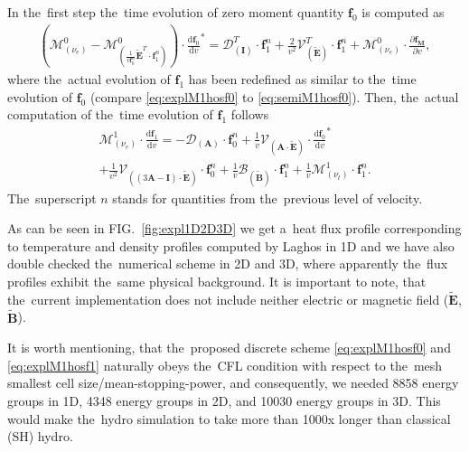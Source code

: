 \documentclass[review]{elsarticle}
\newcommand{\pdv}[2]{\frac{\partial{#1}}{\partial{#2}}}
\newcommand{\vect}[1]{\boldsymbol{#1}}
\newcommand{\matr}[1]{\mathbf{#1}}
\newcommand{\dI}{\text{d}}
\newcommand{\odv}[2]{\frac{\dI #1}{\dI #2}}
\newcommand{\ddv}[2]{\odv{#1}{#2}}
\newcommand{\nue}{\nu_{e}}
\newcommand{\nutot}{\nu_{t}}
\newcommand{\vmag}{v}
\newcommand{\tE}{\vect{\tilde{E}}}
\newcommand{\tB}{\vect{\tilde{B}}}
\newcommand{\fM}{f_M}
\newcommand{\vfzero}{\vect{f}_0}
\newcommand{\fone}{\vect{f}_1}
\newcommand{\MI}{\matr{I}}
\newcommand{\MA}{\matr{A}}
\newcommand{\IM}{\boldsymbol{\mathcal{M}}}
\newcommand{\ID}{\boldsymbol{\mathcal{D}}}
\newcommand{\IV}{\boldsymbol{\mathcal{V}}}
\newcommand{\IB}{\boldsymbol{\mathcal{B}}}
\newcommand{\figref}[1]{FIG.~\ref{#1}}
\begin{document}
In the~first step the~time evolution of zero moment quantity $\vfzero$ is 
computed as
\begin{multline}
  \left( \IM^0_{\left( \nue \right)} 
  - \IM^0_{\left(\frac{1}{\vmag \vfzero^n}\tE^T\cdot\fone^n\right)}
  \right) \cdot {\ddv{\vfzero}{\vmag}}^* 
  = 
  \ID^T_{\left(\MI\right)} \cdot \fone^n 
  + \frac{2}{\vmag^2}\IV^T_{\left(\tE\right)} \cdot \fone^n
  + \IM^0_{\left( \nue \right)} \cdot \pdv{\vect{\fM}}{\vmag} ,  
  \label{eq:explM1hosf0}
\end{multline}
where the~actual evolution of $\fone$ has been redefined as similar to 
the~time evolution of $\vfzero$ (compare \eqref{eq:explM1hosf0} to 
\eqref{eq:semiM1hosf0}). Then, the~actual computation of the~time evolution 
of $\fone$ follows
\begin{multline}
  \IM^1_{\left( \nue \right)} \cdot \ddv{\fone}{\vmag} 
  = 
  - \ID_{\left(\MA\right)}\cdot \vfzero^n  
  + \frac{1}{\vmag}\IV_{\left(\MA \cdot \tE\right)} \cdot
  {\ddv{\vfzero}{\vmag}}^* \\
  + \frac{1}{\vmag^2}\IV_{\left( 
  \left( 3\MA - \MI \right) \cdot \tE \right)} \cdot \vfzero^n
  + \frac{1}{\vmag}\IB_{\left( \tB \right)} \cdot \fone^n
  + \frac{1}{\vmag}\IM^1_{\left( \nutot \right)} 
  \cdot \fone^n .
  \label{eq:explM1hosf1}
\end{multline}
The~superscript $n$ stands for quantities from the~previous level of velocity.

As can be seen in \figref{fig:expl1D2D3D} we get a~heat flux profile 
corresponding to temperature and density profiles computed by Laghos 
\cite{Dobrev_Kolev_Rieben-High-order_curvilinear_finite_element_methods_for_Lagrangian_hydrodynamics}
in 1D and we have also double checked the~numerical scheme in 2D and 3D, where
apparently the~flux profiles exhibit the~same physical background.
It is important to note, that the~current implementation does not include
neither electric or magnetic field ($\tE$, $\tB$).

It is worth mentioning, that the~proposed discrete scheme 
\eqref{eq:explM1hosf0} and \eqref{eq:explM1hosf1} naturally obeys the~CFL
condition with respect to the~mesh smallest cell size/mean-stopping-power, and
consequently, we needed 8858 energy groups in 1D, 4348 energy groups in 2D, and
10030 energy groups in 3D. This would make the~hydro simulation to take 
more than 1000x longer than classical (SH) hydro.
\end{document}
